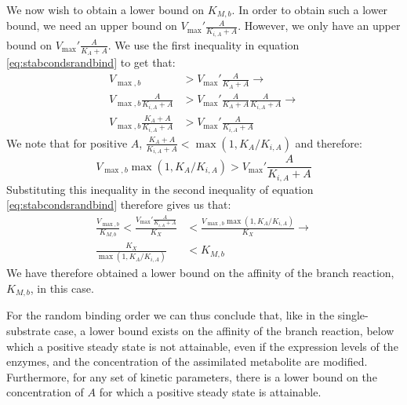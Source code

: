   We now wish to obtain a lower bound on $K_{M,b}$.
  In order to obtain such a lower bound, we need an upper bound on $V_{\max}'\frac{A}{K_{i,A}+A}$.
  However, we only have an upper bound on $V_{\max}'\frac{A}{K_A+A}$.
  We use the first inequality in equation \ref{eq:stabcondsrandbind} to get that:
  \begin{equation*}
      \begin{split}
      V_{\max,b}&>V_{\max}'\frac{A}{K_A+A} \rightarrow \\
      V_{\max,b}\frac{A}{K_{i,A}+A}&>V_{\max}'\frac{A}{K_A+A}\frac{A}{K_{i,A}+A} \rightarrow \\
      V_{\max,b}\frac{K_A+A}{K_{i,A}+A}&>V_{\max}'\frac{A}{K_{i,A}+A}
      \end{split}
  \end{equation*}
  We note that for positive $A$, $\frac{K_A+A}{K_{i,A}+A} < \max(1,K_A/K_{i,A})$ and therefore:
  \begin{equation*}
      V_{\max,b}\max(1,K_A/K_{i,A})>V_{\max}'\frac{A}{K_{i,A}+A}
  \end{equation*}
  Substituting this inequality in the second inequality of equation \ref{eq:stabcondsrandbind} therefore gives us that:
  \begin{equation*}
    \begin{split}
      \frac{V_{\max,b}}{K_{M,b}}<\frac{V_{\max}'\frac{A}{K_{i,A}+A}}{K_X}&<\frac{V_{\max,b}\max(1,K_A/K_{i,A})}{K_X} \rightarrow\\
      \frac{K_X}{\max(1,K_A/K_{i,A})}&<K_{M,b}
    \end{split}
  \end{equation*}
  We have therefore obtained a lower bound on the affinity of the branch reaction, $K_{M,b}$, in this case.

  For the random binding order we can thus conclude that, like in the single-substrate case, a lower bound exists on the affinity of the branch reaction, below which a positive steady state is not attainable, even if the expression levels of the enzymes, and the concentration of the assimilated metabolite are modified.
  Furthermore, for any set of kinetic parameters, there is a lower bound on the concentration of $A$ for which a positive steady state is attainable.

